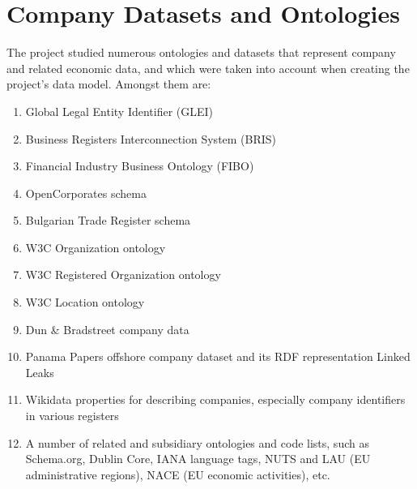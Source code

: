 \documentclass[runningheads,a4paper]{llncs}
\begin{document}
\section{Company Datasets and Ontologies}

The project studied numerous ontologies and datasets that represent company and related economic data, and which were taken into account when creating the project's data model. Amongst them are:
\begin{enumerate}
\item Global Legal Entity Identifier (GLEI)  \cite{_Ref491193712}
\item Business Registers Interconnection System (BRIS)  \cite{_Ref491193639} \cite{_Ref491194142}
\item Financial Industry Business Ontology (FIBO)  \cite{_Ref491193410}
\item OpenCorporates schema  \cite{_Ref491194336}
\item Bulgarian Trade Register schema  \cite{__RefNumPara__603_1597909725}
\item W3C Organization ontology  \cite{_Ref491194417}
\item W3C Registered Organization ontology  \cite{__RefNumPara__857_1597909725}
\item W3C Location ontology  \cite{_Ref491194659}
\item Dun \& Bradstreet company data
\item Panama Papers offshore company dataset  \cite{_Ref491193106} and its RDF representation Linked Leaks  \cite{_Ref491193118}
\item Wikidata properties for describing companies, especially company identifiers in various registers
\item A number of related and subsidiary ontologies and code lists, such as Schema.org, Dublin Core, IANA language tags, NUTS and LAU (EU administrative regions), NACE (EU economic activities), etc.
\end{enumerate}
\end{document}
